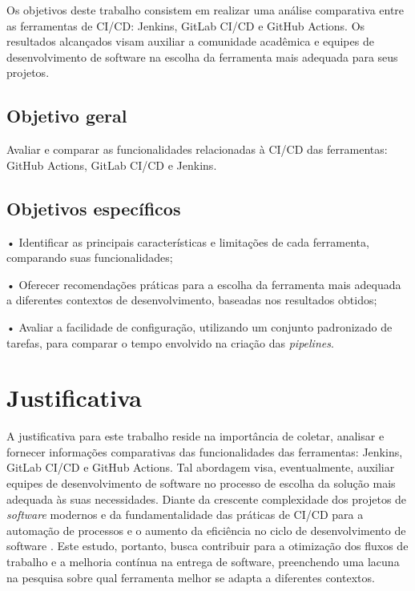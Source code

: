 Os objetivos deste trabalho consistem em realizar uma análise comparativa entre as ferramentas de CI/CD: Jenkins, GitLab CI/CD e GitHub Actions. Os resultados alcançados visam auxiliar a comunidade acadêmica e equipes de desenvolvimento de software na escolha da ferramenta mais adequada para seus projetos.

\subsection{Objetivo geral}\label{subsec:objetivoGeral}

Avaliar e comparar as funcionalidades relacionadas à CI/CD das ferramentas: GitHub Actions, GitLab CI/CD e Jenkins.

\subsection{Objetivos específicos}\label{subsec:objetivosEspecificos}

• Identificar as principais características e limitações de cada ferramenta, comparando suas funcionalidades;

• Oferecer recomendações práticas para a escolha da ferramenta mais adequada a diferentes contextos de desenvolvimento, baseadas nos resultados obtidos;

• Avaliar a facilidade de configuração, utilizando um conjunto padronizado de tarefas, para comparar o tempo envolvido na criação das \textit{pipelines}.

\section{Justificativa}\label{sec:justificativa}

A justificativa para este trabalho reside na importância de coletar, analisar e fornecer informações comparativas das funcionalidades das ferramentas: Jenkins, GitLab CI/CD e GitHub Actions. Tal abordagem visa, eventualmente, auxiliar equipes de desenvolvimento de software no processo de escolha da solução mais adequada às suas necessidades. Diante da crescente complexidade dos projetos de \textit{software} modernos e da fundamentalidade das práticas de CI/CD para a automação de processos e o aumento da eficiência no ciclo de desenvolvimento de software \cite{Fowler2024}. Este estudo, portanto, busca contribuir para a otimização dos fluxos de trabalho e a melhoria contínua na entrega de software, preenchendo uma lacuna na pesquisa sobre qual ferramenta melhor se adapta a diferentes contextos.

